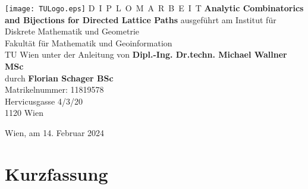 
\begin{titlepage}
  \begin{center}
    \texttt{[image: TULogo.eps]}
    \vskip 1cm
    {\LARGE D~\Large I~P~L~O~M~A~R~B~E~I~T}
    \vskip 8mm
    {\huge\bfseries Analytic Combinatorics and Bijections for Directed Lattice Paths}
    \vskip 1cm
    \large 
    ausgeführt am    
    \vskip 0.75cm
    {\Large Institut für\\[1ex] Diskrete Mathematik und Geometrie}\\[1ex]
    {\Large Fakultät für Mathematik und Geoinformation}\\[1ex]
    {\Large TU Wien}
    \vskip0.75cm
    unter der Anleitung von
    \vskip0.75cm
    {\Large\bfseries Dipl.-Ing. Dr.techn. Michael Wallner MSc}\\[1ex]
    \vskip 0.5cm
    durch
    \vskip 0.5cm
    {\Large\bfseries Florian Schager BSc}\\[1ex]
    Matrikelnummer: { 11819578}\\[1ex]
    { Hervicusgasse 4/3/20}\\[1ex]
    { 1120 Wien}
  \end{center}
  
  \vfill
  
  \small
  Wien, am 14. Februar 2024
  \vspace*{-15mm}
\end{titlepage}

\cleardoublepage

\chapter*{Kurzfassung}
\thispagestyle{empty}

